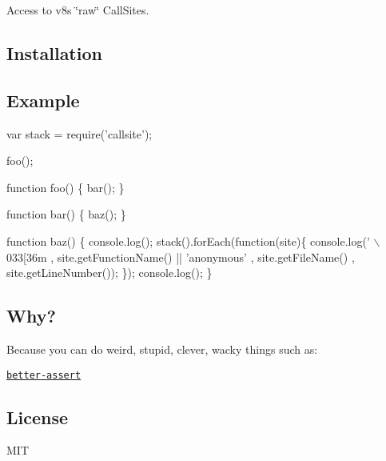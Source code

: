 Access to v8\textquotesingle{}s \char`\"{}raw\char`\"{} {\ttfamily Call\+Site}s.

\subsection*{Installation}



\subsection*{Example}


\begin{DoxyCode}
var stack = require('callsite');

foo();

function foo() \{
  bar();
\}

function bar() \{
  baz();
\}

function baz() \{
  console.log();
  stack().forEach(function(site)\{
    console.log('  \(\backslash\)033[36m%
      , site.getFunctionName() || 'anonymous'
      , site.getFileName()
      , site.getLineNumber());
  \});
  console.log();
\}
\end{DoxyCode}


\subsection*{Why?}

Because you can do weird, stupid, clever, wacky things such as\+:


\begin{DoxyItemize}
\item \href{https://github.com/visionmedia/better-assert}{\tt better-\/assert}
\end{DoxyItemize}

\subsection*{License}

M\+IT 